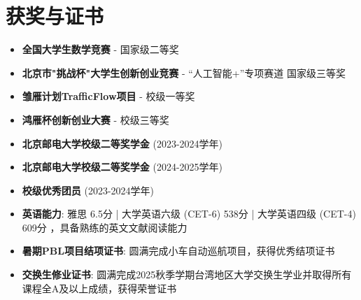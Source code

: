 \documentclass[11pt, a4paper]{article}
\newenvironment{tightemize}{
    \begin{itemize}[leftmargin=*, nosep]
    \setlength{\itemsep}{3pt}
    \setlength{\parskip}{0pt}
}{\end{itemize}}
\begin{document}
\section{获奖与证书}

\begin{tightemize}
    \item \textbf{全国大学生数学竞赛} - 国家级二等奖
    \item \textbf{北京市"挑战杯"大学生创新创业竞赛} - “人工智能+”专项赛道 国家级三等奖
    \item \textbf{雏雁计划TrafficFlow项目} - 校级一等奖
    \item \textbf{鸿雁杯创新创业大赛} - 校级三等奖
    \item \textbf{北京邮电大学校级二等奖学金} (2023-2024学年)
    \item \textbf{北京邮电大学校级二等奖学金} (2024-2025学年)
    \item \textbf{校级优秀团员} (2023-2024学年)
    \item \textbf{英语能力}: 雅思 6.5分 | 大学英语六级 (CET-6)  538分 | 大学英语四级 (CET-4)  609分 ，具备熟练的英文文献阅读能力
    \item \textbf{暑期PBL项目结项证书}: 圆满完成小车自动巡航项目，获得优秀结项证书
    \item \textbf{交换生修业证书}: 圆满完成2025秋季学期台湾地区大学交换生学业并取得所有课程全A及以上成绩，获得荣誉证书
\end{tightemize}
\end{document}

